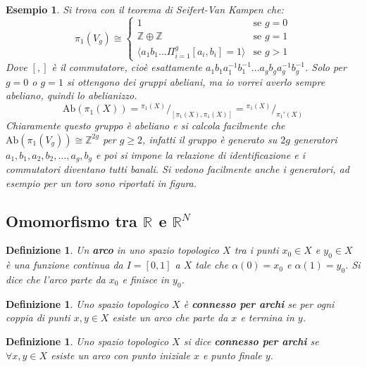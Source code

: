 \documentclass[10pt, twoside=false, x11names]{scrbook}
\newtheorem{definition}[theorem]{Definizione}
\newtheorem{example}[theorem]{Esempio}
\newcommand{\Z}{\mathbb{Z}}
\newcommand{\RN}[1][]{\mathbb{R}^#1}
\newcommand{\Ab}[1]{\mathrm{Ab}\left( #1 \right)}
\newcommand*\quot[2]{{^{\textstyle #1}\big/_{\textstyle #2}}}
\begin{document}
\begin{example}
  Si trova con il teorema di Seifert-Van Kampen che:
  \[
    \pi_1(V_g) \cong
    \begin{cases}
      1 & \text{se } g = 0 \\
      \Z \oplus \Z & \text{se } g = 1 \\
      \langle a_1 b_1 \dots \Pi_{i=1}^g [a_i,b_i] = 1 \rangle & \text{se } g > 1
    \end{cases}
  \]
  Dove $ [,] $ è il commutatore, cioè esattamente $ a_1 b_1 a_1^{-1} b_1^{-1} \dots a_g b_g a_g^{-1} b_g^{-1} $.
  Solo per $ g = 0 $ o $ g = 1 $ si ottengono dei gruppi abeliani, ma io vorrei averlo sempre abeliano, quindi lo abelianizzo.
  \[
    \Ab{\pi_1(X)} = \quot{\pi_1(X)}{[\pi_1(X), \pi_1(X)]} = \quot{\pi_1(X)}{\pi_1'(X)}
  \]
  Chiaramente questo gruppo è abeliano e si calcola facilmente che $ \Ab{\pi_1(V_g)} \cong \Z^{2g} $ per $ g \geq 2 $,
  infatti il gruppo è generato su $ 2 g $ generatori $ a_1, b_1, a_2, b_2, \dots, a_g, b_g $ e poi
  si impone la relazione di identificazione e i commutatori diventano tutti banali.
  Si vedono facilmente anche i generatori, ad esempio per un toro sono riportati in figura.
\end{example}


\subsection{Omomorfismo tra $ \RN{} $ e $ \RN{N} $}

\begin{definition}
  Un \textbf{arco} in uno spazio topologico $ X $ tra i punti $ x_0 \in X $ e $ y_0 \in X $
  è una funzione continua da $ I = [0,1] $ a $ X $ tale che $ \alpha(0) = x_0 $ e $ \alpha(1) = y_0 $.
  Si dice che l'arco parte da $ x_0 $ e finisce in $ y_0 $.
\end{definition}

\begin{definition}
  Uno spazio topologico $ X $ è \textbf{connesso per archi} se per
  ogni coppia di punti $ x, y \in X $ esiste un arco che parte da $ x $ e termina in $ y $.
\end{definition}

\begin{definition}
  Uno spazio topologico $ X $ si dice \textbf{connesso per archi}  se $ \forall x, y \in X $ esiste
  un arco con punto iniziale $ x $ e punto finale $ y $.
\end{definition}
\end{document}
